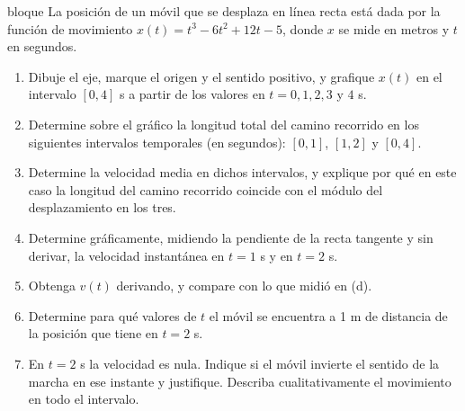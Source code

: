 \documentclass[11pt,openany]{book}
\begin{document}
\begin{ejercicio}{bloque}
La posición de un móvil que se desplaza en línea recta está dada por la función de movimiento $x(t) = t^3 - 6t^2 + 12t - 5$, donde $x$ se mide en metros y $t$ en segundos.
\begin{enumerate}[label=(\alph*), leftmargin=1.7em, itemsep=1pt, topsep=3pt]
  \item Dibuje el eje, marque el origen y el sentido positivo, y grafique $x(t)$ en el intervalo $[0, 4]$ s a partir de los valores en $t = 0, 1, 2, 3$ y $4$ s.
  \item Determine sobre el gráfico la longitud total del camino recorrido en los siguientes intervalos temporales (en segundos): $[0, 1]$, $[1, 2]$ y $[0, 4]$.
  \item Determine la velocidad media en dichos intervalos, y explique por qué en este caso la longitud del camino recorrido coincide con el módulo del desplazamiento en los tres.
  \item Determine gráficamente, midiendo la pendiente de la recta tangente y sin derivar, la velocidad instantánea en $t = 1$ s y en $t = 2$ s.
  \item Obtenga $v(t)$ derivando, y compare con lo que midió en (d).
  \item Determine para qué valores de $t$ el móvil se encuentra a 1 m de distancia de la posición que tiene en $t = 2$ s.
  \item En $t = 2$ s la velocidad es nula. Indique si el móvil invierte el sentido de la marcha en ese instante y justifique. Describa cualitativamente el movimiento en todo el intervalo.
\end{enumerate}
\end{ejercicio}
\end{document}
